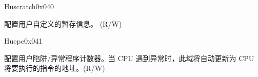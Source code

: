 \begin{register}{H}{uscratch}{0x040}\label{regdesc:USCRATCH}
%
\regnewline%
\begin{regdesc}\begin{reglist}
\label{fielddesc:USCRATCH}\item [USCRATCH] 配置用户自定义的暂存信息。 (R/W)
\end{reglist}\end{regdesc}
\end{register}

\begin{register}{H}{uepc}{0x041}\label{regdesc:UEPC}
%
\regnewline%
\begin{regdesc}\begin{reglist}
\label{fielddesc:UEPC}\item [UEPC] 配置用户陷阱/异常程序计数器。当 CPU 遇到异常时，此域将自动更新为 CPU 将要执行的指令的地址。(R/W)
\end{reglist}\end{regdesc}
\end{register}

